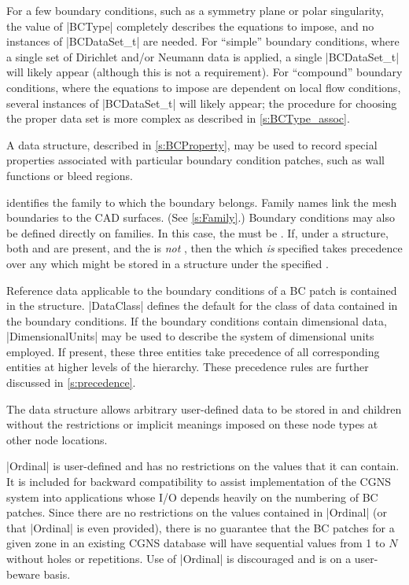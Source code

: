 For a few boundary conditions, such as a symmetry plane or polar
singularity, the value of |BCType| completely describes the equations to
impose, and no instances of |BCDataSet_t| are needed.
For ``simple'' boundary conditions, where a single set of Dirichlet and/or
Neumann data is applied, a single |BCDataSet_t| will likely appear
(although this is not a requirement).
For ``compound'' boundary conditions, where the equations to impose are
dependent on local flow conditions, several instances of |BCDataSet_t|
will likely appear; the procedure for choosing the proper data set is
more complex as described in \autoref{s:BCType_assoc}.

A  data structure, described in
\autoref{s:BCProperty}, may be used to record special properties
associated with particular boundary condition patches, such as wall
functions or bleed regions.

 identifies the family to which the boundary belongs.
Family names link the mesh boundaries to the CAD surfaces.
(See \autoref{s:Family}.)
Boundary conditions may also be defined directly on families.
In this case, the  must be .
If, under a  structure, both  and
 are present, and the  is \emph{not}
, then the  which \emph{is} specified
takes precedence over any  which might be stored in a
 structure under the specified .

Reference data applicable to the boundary conditions of a BC patch is
contained in the  structure.
|DataClass| defines the default for the class of data contained in the
boundary conditions.
If the boundary conditions contain dimensional data, |DimensionalUnits|
may be used to describe the system of dimensional units employed.
If present, these three entities take precedence of all corresponding
entities at higher levels of the hierarchy.
These precedence rules are further discussed in \autoref{s:precedence}.

The  data structure allows arbitrary
user-defined data to be stored in  and
 children without the restrictions or implicit
meanings imposed on these node types at other node locations.

|Ordinal| is user-defined and has no restrictions on the values that
it can contain.
It is included for backward compatibility to assist implementation of
the CGNS system into applications whose I/O depends heavily on the
numbering of BC patches.
Since there are no restrictions on the values contained in |Ordinal|
(or that |Ordinal| is even provided), there is no guarantee that the
BC patches for a given zone in an existing CGNS database will have
sequential values from 1 to $N$ without holes or repetitions.
Use of |Ordinal| is discouraged and is on a user-beware basis.

